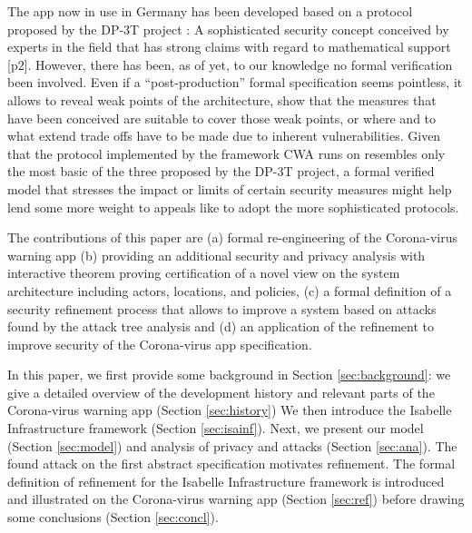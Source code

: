\documentclass{llncs}
\begin{document}
The app now in use in Germany has been developed based on a protocol proposed by the DP-3T project \cite{dp3t:github}:
A sophisticated security concept
conceived by experts in the field that has strong claims with regard to mathematical support \cite{dp3t:wp} [p2].
%
%
However, there has been, as of yet, to our knowledge no formal verification been involved.
Even if a ``post-production'' formal specification seems pointless, 
it allows to reveal weak points of the architecture, show that the measures that have
been conceived are suitable to cover those weak points,
or where and to what extend trade offs have to be made due to inherent vulnerabilities.
Given that the protocol implemented by the framework CWA runs on resembles only the most basic
of the three proposed by the DP-3T project,
a formal verified model that stresses the impact or limits of certain security measures
might help lend some more weight to appeals like \cite{dp3t:impl}
to adopt the more sophisticated protocols.
%

The contributions of this paper are (a) formal re-engineering of the Corona-virus warning app
(b) providing an additional security and privacy analysis with interactive theorem proving
certification of a novel view on the system architecture including actors, locations, and policies,
(c) a formal definition of a security refinement process that allows to improve a system
based on attacks found by the attack tree analysis and (d) an application of the refinement to
improve security of the Corona-virus app specification.

In this paper, we first provide some background in Section \ref{sec:background}:
we give a detailed overview of the development history %
and relevant parts of the Corona-virus warning app (Section \ref{sec:history})
We then introduce the Isabelle Infrastructure framework (Section \ref{sec:isainf}).
Next, we present our model (Section \ref{sec:model}) and analysis of privacy and
attacks (Section \ref{sec:ana}). The found attack on the first abstract specification
motivates refinement. The formal definition of refinement for the Isabelle Infrastructure
framework is introduced and illustrated on the Corona-virus warning app (Section \ref{sec:ref})
before drawing some conclusions (Section \ref{sec:concl}).
\end{document}

